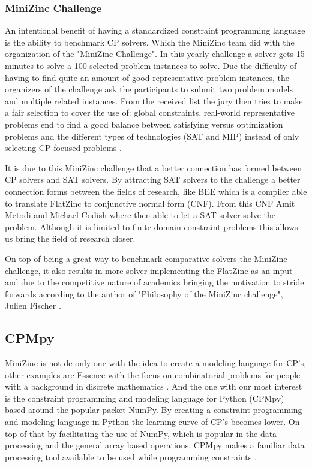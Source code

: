 \subsubsection{MiniZinc Challenge}
An intentional benefit of having a standardized constraint programming language is the ability to benchmark CP solvers. Which the MiniZinc team did with the organization of the "MiniZinc Challenge". In this yearly challenge a solver gets  15 minutes to solve a 100 selected problem instances to solve. Due the difficulty of having to find quite an amount of good representative problem instances, the organizers of the challenge ask the participants to submit two problem models and multiple related instances. From the received list the jury then tries to make a fair selection to cover the use of: global constraints, real-world representative problems end to find a good balance between satisfying versus optimization problems and the different types of technologies (SAT and MIP) instead of only selecting CP focused problems \cite{58stuckey2014minizinc}.

It is due to this MiniZinc challenge that a better connection has formed between CP solvers and SAT solvers. By attracting SAT solvers to the challenge a better connection forms between the fields of research, like BEE \cite{69BEEmetodi2012compiling} which is a compiler able to translate FlatZinc to conjunctive normal form (CNF). From this CNF Amit Metodi and Michael Codish where then able to let a SAT solver solve the problem. Although it is limited to finite domain constraint problems this allows us bring the field of research closer.

On top of being a great way to benchmark comparative solvers the MiniZinc challenge, it also results in more solver implementing the FlatZinc as an input and due to the competitive nature of academics bringing the motivation to stride forwards according to the author of "Philosophy of the MiniZinc challenge", Julien Fischer \cite{59stuckey2010philosophy}.

\subsection{CPMpy}
\label{CP:CPMpy}
MiniZinc is not de only one with the idea to create a modeling language for CP's, other examples are Essence with the focus on combinatorial problems for people with a background in discrete mathematics \cite{70frisch2008essence}.
And the one with our most interest is the constraint programming and modeling language for Python (CPMpy) based around the popular packet NumPy. By creating a constraint programming and modeling language in Python the learning curve of CP's becomes lower. On top of that by facilitating the use of NumPy, which is popular in the data processing and the general array based operations, CPMpy makes a familiar data processing tool available to be used while programming constraints \cite{17guns2019increasing}.

